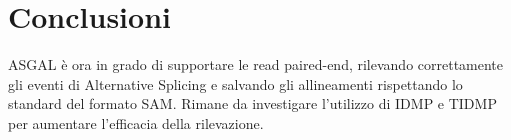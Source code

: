 \section{Conclusioni}
ASGAL è ora in grado di supportare le read paired-end, rilevando correttamente gli eventi di Alternative Splicing e salvando gli allineamenti rispettando lo standard del formato SAM. Rimane da investigare l'utilizzo di IDMP e TIDMP per aumentare l'efficacia della rilevazione.